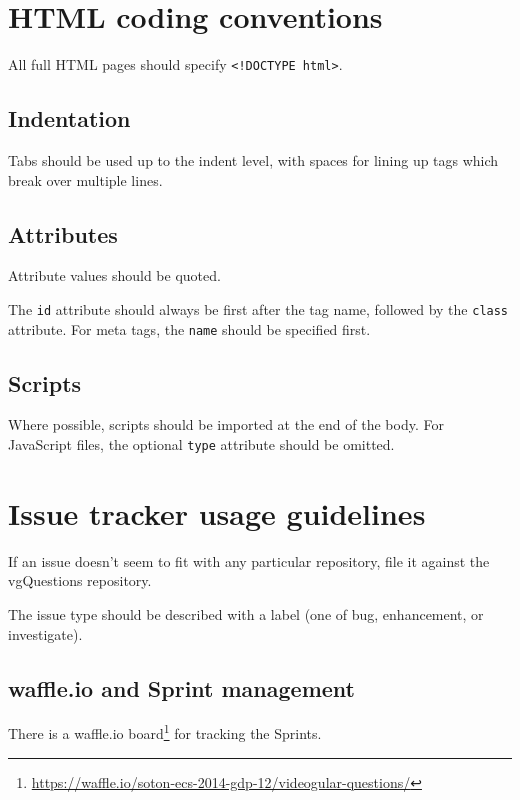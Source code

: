 \section{HTML coding conventions}

All full HTML pages should specify
\texttt{\textless{}!DOCTYPE html\textgreater{}}.

\subsection{Indentation}

Tabs should be used up to the indent level, with spaces for lining up
tags which break over multiple lines.

\subsection{Attributes}

Attribute values should be quoted.

The \texttt{id} attribute should always be first after the tag name,
followed by the \texttt{class} attribute. For meta tags, the
\texttt{name} should be specified first.

\subsection{Scripts}

Where possible, scripts should be imported at the end of the body. For
JavaScript files, the optional \texttt{type} attribute should be
omitted.

\section{Issue tracker usage guidelines}

If an issue doesn't seem to fit with any particular repository, file it
against the \gls{vgQuestions} repository.

The issue type should be described with a label (one of bug,
enhancement, or investigate).

\subsection{waffle.io and Sprint management}

There is a waffle.io board\footnote{\url{https://waffle.io/soton-ecs-2014-gdp-12/videogular-questions/}}
for tracking the Sprints.

